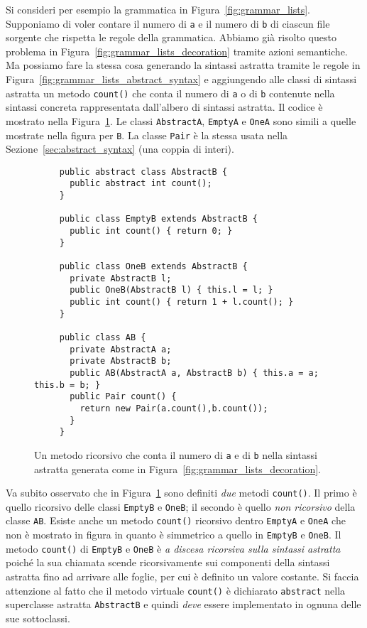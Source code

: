 Si consideri per esempio la grammatica in Figura~\ref{fig:grammar_lists}.
Supponiamo di voler contare
il numero di \texttt{a} e il numero di \texttt{b} di ciascun file sorgente
che rispetta le regole della grammatica. Abbiamo gi\`a risolto questo
problema in Figura~\ref{fig:grammar_lists_decoration} tramite azioni
semantiche. Ma possiamo fare la stessa cosa generando la sintassi astratta
tramite le regole in Figura~\ref{fig:grammar_lists_abstract_syntax} e
aggiungendo alle classi di sintassi astratta un metodo
\texttt{count()} che conta il numero di \texttt{a} o di \texttt{b}
contenute nella sintassi concreta rappresentata dall'albero di sintassi
astratta. Il codice \`e mostrato nella Figura~\ref{fig:grammar_lists_count}.
Le classi \texttt{AbstractA}, \texttt{EmptyA} e \texttt{OneA} sono
simili a quelle mostrate nella figura per \texttt{B}.
La classe \texttt{Pair} \`e la
stessa usata nella Sezione~\ref{sec:abstract_syntax} (una coppia di interi).
%
\begin{figure}[t]
\begin{verbatim}
     public abstract class AbstractB {
       public abstract int count();
     }

     public class EmptyB extends AbstractB {
       public int count() { return 0; }
     }

     public class OneB extends AbstractB {
       private AbstractB l;
       public OneB(AbstractB l) { this.l = l; }
       public int count() { return 1 + l.count(); }
     }

     public class AB {
       private AbstractA a;
       private AbstractB b;
       public AB(AbstractA a, AbstractB b) { this.a = a; this.b = b; }
       public Pair count() {
         return new Pair(a.count(),b.count());
       }
     }
\end{verbatim}
\caption{Un metodo ricorsivo che conta il numero di \texttt{a} e di \texttt{b}
         nella sintassi astratta generata come in
         Figura~\ref{fig:grammar_lists_decoration}.}
  \label{fig:grammar_lists_count}
\end{figure}

Va subito osservato che in Figura~\ref{fig:grammar_lists_count} sono
definiti \emph{due} metodi \texttt{count()}. Il primo \`e quello
ricorsivo delle classi \texttt{EmptyB} e \texttt{OneB}; il secondo \`e quello
\emph{non ricorsivo} della classe \texttt{AB}. Esiste anche un metodo
\texttt{count()} ricorsivo dentro \texttt{EmptyA} e \texttt{OneA} che non
\`e mostrato in figura in quanto \`e simmetrico a quello in
\texttt{EmptyB} e \texttt{OneB}.
Il metodo \texttt{count()} di \texttt{EmptyB} e \texttt{OneB} \`e
\emph{a discesa ricorsiva sulla sintassi astratta} poich\'e la sua
chiamata scende ricorsivamente sui componenti della sintassi astratta fino
ad arrivare alle foglie, per cui \`e definito un valore costante.
Si faccia attenzione al fatto che
il metodo virtuale \texttt{count()} \`e dichiarato
\texttt{abstract} nella superclasse astratta \texttt{AbstractB} e quindi
\emph{deve} essere implementato in ognuna delle sue sottoclassi.

